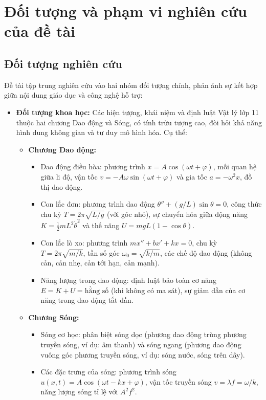 \section{Đối tượng và phạm vi nghiên cứu của đề tài}

\subsection{Đối tượng nghiên cứu}
Đề tài tập trung nghiên cứu vào hai nhóm đối tượng chính, phản ánh sự kết hợp giữa nội dung giáo dục và công nghệ hỗ trợ:

\begin{itemize}
    \item \textbf{Đối tượng khoa học:} Các hiện tượng, khái niệm và định luật Vật lý lớp 11 thuộc hai chương Dao động và Sóng, có tính trừu tượng cao, đòi hỏi khả năng hình dung không gian và tư duy mô hình hóa. Cụ thể:
    \begin{itemize}
        \item \textbf{Chương Dao động:}
        \begin{itemize}
            \item Dao động điều hòa: phương trình $x = A\cos(\omega t + \varphi)$, mối quan hệ giữa li độ, vận tốc $v = -A\omega\sin(\omega t + \varphi)$ và gia tốc $a = -\omega^2 x$, đồ thị dao động.
            \item Con lắc đơn: phương trình dao động $\theta'' + (g/L)\sin\theta = 0$, công thức chu kỳ $T = 2\pi\sqrt{L/g}$ (với góc nhỏ), sự chuyển hóa giữa động năng $K = \frac{1}{2}mL^2\dot{\theta}^2$ và thế năng $U = mgL(1-\cos\theta)$.
            \item Con lắc lò xo: phương trình $mx'' + bx' + kx = 0$, chu kỳ $T = 2\pi\sqrt{m/k}$, tần số góc $\omega_0 = \sqrt{k/m}$, các chế độ dao động (không cản, cản nhẹ, cản tới hạn, cản mạnh).
            \item Năng lượng trong dao động: định luật bảo toàn cơ năng $E = K + U = \text{hằng số}$ (khi không có ma sát), sự giảm dần của cơ năng trong dao động tắt dần.
        \end{itemize}
        \item \textbf{Chương Sóng:}
        \begin{itemize}
            \item Sóng cơ học: phân biệt sóng dọc (phương dao động trùng phương truyền sóng, ví dụ: âm thanh) và sóng ngang (phương dao động vuông góc phương truyền sóng, ví dụ: sóng nước, sóng trên dây).
            \item Các đặc trưng của sóng: phương trình sóng $u(x,t) = A\cos(\omega t - kx + \varphi)$, vận tốc truyền sóng $v = \lambda f = \omega/k$, năng lượng sóng tỉ lệ với $A^2f^2$.

\end{itemize}
\end{itemize}
\end{itemize}
